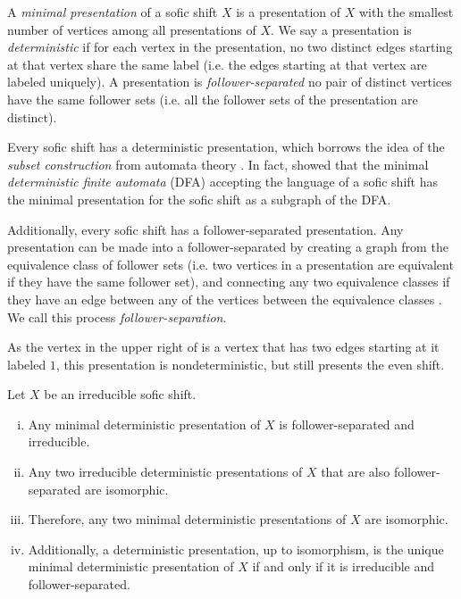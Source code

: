 \documentclass[hidelinks]{report}
\newcommand{\Gc}{\mathcal{G}}  %
\newcommand{\term}[1]{\textit{#1}}
\theoremstyle{definition}
\begin{document}
A \term{minimal presentation} of a sofic shift \(X\) is a presentation 
of \(X\) with the smallest number of vertices among all presentations of \(X\). 
We say a presentation is \term{deterministic} if for each vertex in the presentation,
no two distinct edges starting at that vertex share the same label (i.e. the edges 
starting at that vertex are labeled uniquely). A presentation 
is \term{follower-separated} no pair of distinct vertices have the same follower 
sets (i.e. all the follower sets of the presentation are distinct). 

Every sofic shift has a deterministic presentation, which borrows the idea of the
\term{subset construction} from automata theory \cite{hopcroft2001introduction}.
In fact, \cite{jonoska1996sofic} showed that the minimal \term{deterministic finite 
automata} (DFA) accepting the 
language of a sofic shift has the minimal presentation for the 
sofic shift as a subgraph of the DFA. 

Additionally, every sofic shift has a follower-separated presentation. 
Any presentation can be made into a follower-separated by creating 
a graph from the equivalence class of follower sets (i.e. two vertices 
in a presentation are equivalent if they have the same follower set), 
and connecting any two equivalence classes if they have an edge 
between any of the vertices between the equivalence classes \cite{lind1995introduction}.
We call this process \term{follower-separation}.

\begin{example}
    As the vertex in the upper right of  
    is a vertex that has two edges starting at it labeled \(1\),
    this presentation is nondeterministic, but still presents 
    the even shift.
\end{example}

\begin{theorem}[name=\cite{lind1995introduction} Fundamental theorem of minimal deterministic presentations of irreducible sofic shifts]\label{fundamental}
    Let \(X\) be an irreducible sofic shift.
    \begin{enumerate}[(i)]
        \item Any minimal deterministic presentation of \(X\) is follower-separated and irreducible.
        \item Any two irreducible deterministic presentations of \(X\) 
        that are also follower-\\separated are isomorphic.
        \item Therefore, any two minimal deterministic presentations of \(X\) are isomorphic.
        \item Additionally, a deterministic presentation, up to isomorphism, is the unique minimal deterministic presentation of \(X\)
        if and only if it is irreducible and follower-separated.
    \end{enumerate}
\end{theorem}
\end{document}
